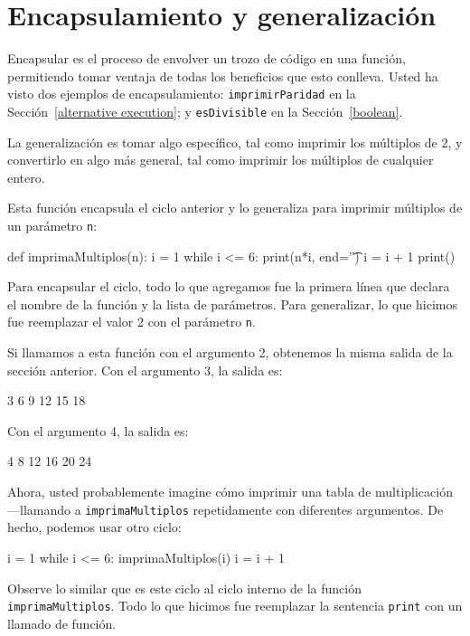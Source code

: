 \section{Encapsulamiento y generalización}

\label{encapsulation}

  

Encapsular es el proceso de envolver un trozo de código en una función,
permitiendo tomar ventaja de todas los beneficios que esto conlleva.
Usted ha visto dos ejemplos de encapsulamiento: \texttt{imprimirParidad}
en la Sección~\ref{alternative execution}; y \texttt{esDivisible}
en la Sección~\ref{boolean}.

La generalización es tomar algo específico, tal como imprimir los
múltiplos de 2, y convertirlo en algo más general, tal como imprimir
los múltiplos de cualquier entero.

Esta función encapsula el ciclo anterior y lo generaliza para imprimir
múltiplos de un parámetro \texttt{n}:
\begin{pythoncode}
def imprimaMultiplos(n):
  i = 1
  while i <= 6:
    print(n*i, end='\t')
    i = i + 1
  print()
\end{pythoncode}

Para encapsular el ciclo, todo lo que agregamos fue la primera línea
que declara el nombre de la función y la lista de parámetros. Para
generalizar, lo que hicimos fue reemplazar el valor 2 con el parámetro
\texttt{n}.

Si llamamos a esta función con el argumento 2, obtenemos la misma
salida de la sección anterior. Con el argumento 3, la salida es:
\begin{pythoncode}
3      6      9      12     15     18
\end{pythoncode}
Con el argumento 4, la salida es:
\begin{pythoncode}
4      8      12     16     20     24
\end{pythoncode}
Ahora, usted probablemente imagine cómo imprimir una tabla de multiplicación
—llamando a \texttt{imprimaMultiplos} repetidamente con diferentes
argumentos. De hecho, podemos usar otro ciclo:

\begin{pythoncode}
i = 1
while i <= 6:
  imprimaMultiplos(i)
  i = i + 1
\end{pythoncode}

Observe lo similar que es este ciclo al ciclo interno de la función
\texttt{imprimaMultiplos}. Todo lo que hicimos fue reemplazar la sentencia
\texttt{print} con un llamado de función.

